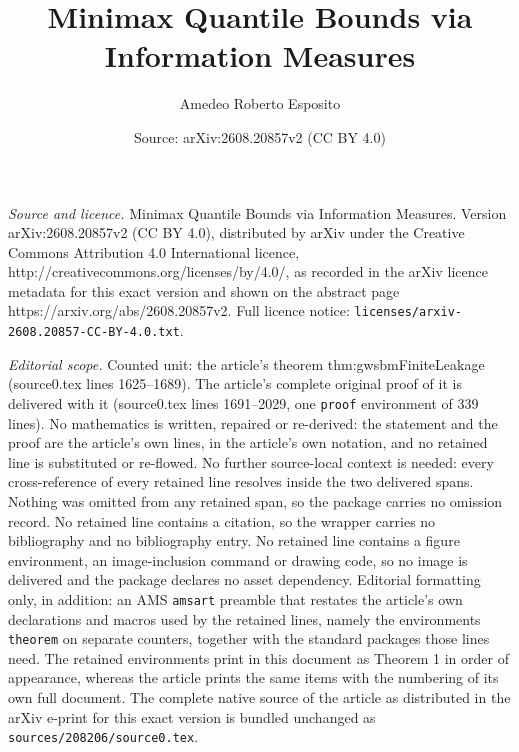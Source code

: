 \documentclass[10pt,a4paper]{amsart}
\title{Minimax Quantile Bounds via Information Measures}
\author{Amedeo Roberto Esposito}
\date{Source: arXiv:2608.20857v2 (CC BY 4.0)}
\begin{document}
\maketitle

\noindent\emph{Source and licence.} Minimax Quantile Bounds via Information Measures. Version arXiv:2608.20857v2 (CC BY 4.0), distributed by arXiv under the Creative Commons Attribution 4.0 International licence, http://creativecommons.org/licenses/by/4.0/, as recorded in the arXiv licence metadata for this exact version and shown on the abstract page https://arxiv.org/abs/2608.20857v2. Full licence notice: \texttt{licenses/arxiv-2608.20857-CC-BY-4.0.txt}.\par\smallskip

\noindent\textit{Editorial scope.} Counted unit: the article's theorem thm:gwsbmFiniteLeakage (source0.tex lines 1625--1689). The article's complete original proof of it is delivered with it (source0.tex lines 1691--2029, one \texttt{proof} environment of 339 lines). No mathematics is written, repaired or re-derived: the statement and the proof are the article's own lines, in the article's own notation, and no retained line is substituted or re-flowed.  No further source-local context is needed: every cross-reference of every retained line resolves inside the two delivered spans.  Nothing was omitted from any retained span, so the package carries no omission record.  No retained line contains a citation, so the wrapper carries no bibliography and no bibliography entry.  No retained line contains a figure environment, an image-inclusion command or drawing code, so no image is delivered and the package declares no asset dependency.  Editorial formatting only, in addition: an AMS \texttt{amsart} preamble that restates the article's own declarations and macros used by the retained lines, namely the environments \texttt{theorem} on separate counters, together with the standard packages those lines need.  The retained environments print in this document as Theorem 1 in order of appearance, whereas the article prints the same items with the numbering of its own full document.  The complete native source of the article as distributed in the arXiv e-print for this exact version is bundled unchanged as \texttt{sources/208206/source0.tex}.
\end{document}
